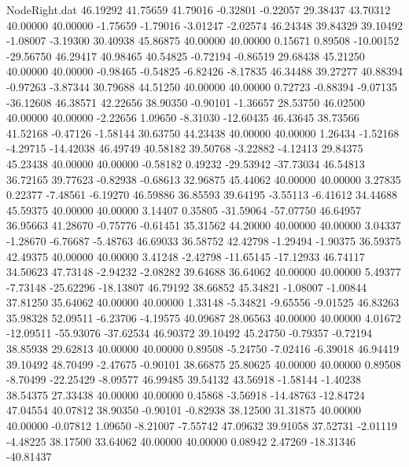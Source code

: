 \begin{filecontents}{NodeRight.dat}
  46.19292   41.75659   41.79016    -0.32801   -0.22057   29.38437   43.70312   40.00000   40.00000   -1.75659   -1.79016   -3.01247   -2.02574
  46.24348   39.84329   39.10492    -1.08007   -3.19300   30.40938   45.86875   40.00000   40.00000    0.15671    0.89508  -10.00152  -29.56750
  46.29417   40.98465   40.54825    -0.72194   -0.86519   29.68438   45.21250   40.00000   40.00000   -0.98465   -0.54825   -6.82426   -8.17835
  46.34488   39.27277   40.88394    -0.97263   -3.87344   30.79688   44.51250   40.00000   40.00000    0.72723   -0.88394   -9.07135  -36.12608
  46.38571   42.22656   38.90350    -0.90101   -1.36657   28.53750   46.02500   40.00000   40.00000   -2.22656    1.09650   -8.31030  -12.60435
  46.43645   38.73566   41.52168    -0.47126   -1.58144   30.63750   44.23438   40.00000   40.00000    1.26434   -1.52168   -4.29715  -14.42038
  46.49749   40.58182   39.50768    -3.22882   -4.12413   29.84375   45.23438   40.00000   40.00000   -0.58182    0.49232  -29.53942  -37.73034
  46.54813   36.72165   39.77623    -0.82938   -0.68613   32.96875   45.44062   40.00000   40.00000    3.27835    0.22377   -7.48561   -6.19270
  46.59886   36.85593   39.64195    -3.55113   -6.41612   34.44688   45.59375   40.00000   40.00000    3.14407    0.35805  -31.59064  -57.07750
  46.64957   36.95663   41.28670    -0.75776   -0.61451   35.31562   44.20000   40.00000   40.00000    3.04337   -1.28670   -6.76687   -5.48763
  46.69033   36.58752   42.42798    -1.29494   -1.90375   36.59375   42.49375   40.00000   40.00000    3.41248   -2.42798  -11.65145  -17.12933
  46.74117   34.50623   47.73148    -2.94232   -2.08282   39.64688   36.64062   40.00000   40.00000    5.49377   -7.73148  -25.62296  -18.13807
  46.79192   38.66852   45.34821    -1.08007   -1.00844   37.81250   35.64062   40.00000   40.00000    1.33148   -5.34821   -9.65556   -9.01525
  46.83263   35.98328   52.09511    -6.23706   -4.19575   40.09687   28.06563   40.00000   40.00000    4.01672  -12.09511  -55.93076  -37.62534
  46.90372   39.10492   45.24750    -0.79357   -0.72194   38.85938   29.62813   40.00000   40.00000    0.89508   -5.24750   -7.02416   -6.39018
  46.94419   39.10492   48.70499    -2.47675   -0.90101   38.66875   25.80625   40.00000   40.00000    0.89508   -8.70499  -22.25429   -8.09577
  46.99485   39.54132   43.56918    -1.58144   -1.40238   38.54375   27.33438   40.00000   40.00000    0.45868   -3.56918  -14.48763  -12.84724
  47.04554   40.07812   38.90350    -0.90101   -0.82938   38.12500   31.31875   40.00000   40.00000   -0.07812    1.09650   -8.21007   -7.55742
  47.09632   39.91058   37.52731    -2.01119   -4.48225   38.17500   33.64062   40.00000   40.00000    0.08942    2.47269  -18.31346  -40.81437

\end{filecontents}
